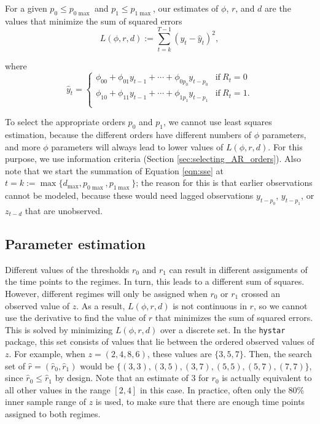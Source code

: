 \documentclass{article}
\begin{document}
For a given $p_0 \le p_{0\max}$ and $p_1 \le p_{1\max}$, our estimates of $\phi$, $r$, and $d$ are the values that minimize the sum of squared errors
\begin{equation} \label{eqn:sse}
L(\phi, r, d) := \sum_{t = k}^{T-1} (y_t - \hat{y}_t)^2,
\end{equation}

\noindent where
\begin{equation}
\hat{y}_t = 
\begin{cases}
\phi_{00} + \phi_{01} y_{t-1} + \cdots + \phi_{0 p_0} y_{t-p_0} 
& \text{if}~R_{t} = 0\\
\phi_{10} + \phi_{11} y_{t-1} + \cdots + \phi_{1 p_1} y_{t-p_1} 
& \text{if}~R_{t} = 1. \\
\end{cases}
\end{equation}

To select the appropriate orders $p_0$ and $p_1$, we cannot use least squares estimation, because the different orders have different numbers of $\phi$ parameters, and more $\phi$ parameters will always lead to lower values of $L(\phi, r, d)$. For this purpose, we use information criteria (Section \ref{sec:selecting_AR_orders}).
Also note that we start the summation of Equation \ref{eqn:sse} at $t = k :=\max\{d_{\max}, p_{0\max}, p_{1\max}\}$; the reason for this is that earlier observations cannot be modeled, because these would need lagged observations $y_{t-p_0}$, $y_{t-p_1}$, or $z_{t-d}$ that are unobserved.

\subsection{Parameter estimation} 
\label{sec:estimation}
Different values of the thresholds $r_0$ and $r_1$ can result in different assignments of the time points to the regimes. In turn, this leads to a different sum of squares. 
However, different regimes will only be assigned when $r_0$ or $r_1$ crossed an observed value of $z$. 
As a result, $L(\phi, r, d)$ is not continuous in $r$, so we cannot use the derivative to find the value of $r$ that minimizes the sum of squared errors.
This is solved by minimizing $L(\phi, r, d)$ over a discrete set. 
In the \texttt{hystar} package, this set consists of values that lie between the ordered observed values of $z$.
For example, when $z = (2, 4, 8, 6)$, these values are $\{3, 5, 7\}$.
Then, the search set of $\hat{r} = (\hat{r}_0, \hat{r}_1)$ would be $\{(3, 3), (3, 5), (3, 7), (5,5), (5, 7), (7, 7)\}$, since $\hat{r}_0 \le \hat{r}_1$ by design. Note that an estimate of 3 for $r_0$ is actually equivalent to all other values in the range $[2, 4]$ in this case.
In practice, often only the 80\% inner sample range of $z$ is used, to make sure that there are enough time points assigned to both regimes.
\end{document}
